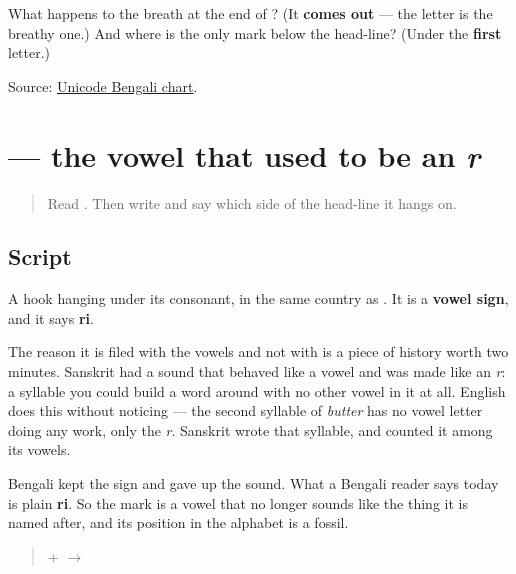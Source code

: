 \begin{tcolorbox}[breakable,colback=teal!4,colframe=teal!35!black,title={Before you move on}]
What happens to the breath at the end of \textbf{}? (It \textbf{comes out} — the letter is the breathy one.) And where is the only mark below the head-line? (Under the \textbf{first} letter.)

Source: \href{https://www.unicode.org/charts/PDF/U0980.pdf}{Unicode Bengali chart}.
\end{tcolorbox}
\section[\texorpdfstring{\bn{ৃ} (-ri)}{ৃ (-ri)}]{ — the vowel that used to be an \emph{r}}

\label{lesson:BN-W04-ri-matra}



\begin{quote}
Read \textbf{}. Then write \textbf{} and say which side of the head-line it hangs on.
\end{quote}

\subsection*{Script}
\begin{quote}
\end{quote}

A hook hanging under its consonant, in the same country as \textbf{}. It is a \textbf{vowel sign}, and it says \textbf{ri}.

The reason it is filed with the vowels and not with \textbf{} is a piece of history worth two minutes. Sanskrit had a sound that behaved like a vowel and was made like an \emph{r}: a syllable you could build a word around with no other vowel in it at all. English does this without noticing — the second syllable of \emph{butter} has no vowel letter doing any work, only the \emph{r}. Sanskrit wrote that syllable, and counted it among its vowels.

Bengali kept the sign and gave up the sound. What a Bengali reader says today is plain \textbf{ri}. So the mark is a vowel that no longer sounds like the thing it is named after, and its position in the alphabet is a fossil.

\begin{quote}
\textbf{} + \textbf{} $\to$ \textbf{}
\end{quote}

